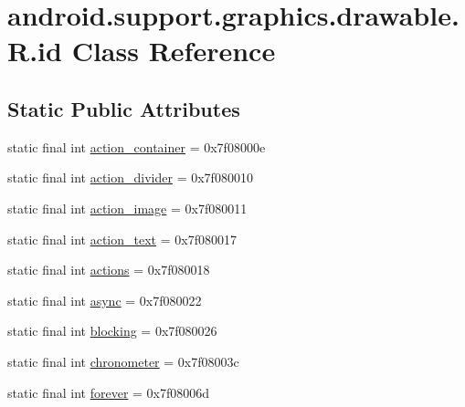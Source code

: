 \hypertarget{classandroid_1_1support_1_1graphics_1_1drawable_1_1R_1_1id}{}\section{android.\+support.\+graphics.\+drawable.\+R.\+id Class Reference}
\label{classandroid_1_1support_1_1graphics_1_1drawable_1_1R_1_1id}
\subsection*{Static Public Attributes}
\begin{DoxyCompactItemize}
\item 
static final int \mbox{\hyperlink{classandroid_1_1support_1_1graphics_1_1drawable_1_1R_1_1id_a30932d97517388e9666277c886f33d52}{action\+\_\+container}} = 0x7f08000e
\item 
static final int \mbox{\hyperlink{classandroid_1_1support_1_1graphics_1_1drawable_1_1R_1_1id_a9266e81cdb75c20cecd21e7390ea377b}{action\+\_\+divider}} = 0x7f080010
\item 
static final int \mbox{\hyperlink{classandroid_1_1support_1_1graphics_1_1drawable_1_1R_1_1id_a08713a5c478ae6b3e142e63ef9a8c788}{action\+\_\+image}} = 0x7f080011
\item 
static final int \mbox{\hyperlink{classandroid_1_1support_1_1graphics_1_1drawable_1_1R_1_1id_a59b447ee33c712fe3be6c44ba8d30add}{action\+\_\+text}} = 0x7f080017
\item 
static final int \mbox{\hyperlink{classandroid_1_1support_1_1graphics_1_1drawable_1_1R_1_1id_aa0d8db26164bce410f39c9ad39fc25b1}{actions}} = 0x7f080018
\item 
static final int \mbox{\hyperlink{classandroid_1_1support_1_1graphics_1_1drawable_1_1R_1_1id_a5216cd03a2ef71262b45065d497732ee}{async}} = 0x7f080022
\item 
static final int \mbox{\hyperlink{classandroid_1_1support_1_1graphics_1_1drawable_1_1R_1_1id_a660f8c1a84df705acdd2194d63a27dc4}{blocking}} = 0x7f080026
\item 
static final int \mbox{\hyperlink{classandroid_1_1support_1_1graphics_1_1drawable_1_1R_1_1id_a336ddf79e77d986bd0841b334eed2fad}{chronometer}} = 0x7f08003c
\item 
static final int \mbox{\hyperlink{classandroid_1_1support_1_1graphics_1_1drawable_1_1R_1_1id_a67c3d78718f2d53cffb600a5cbeb4392}{forever}} = 0x7f08006d
\item 

\end{DoxyCompactItemize}

